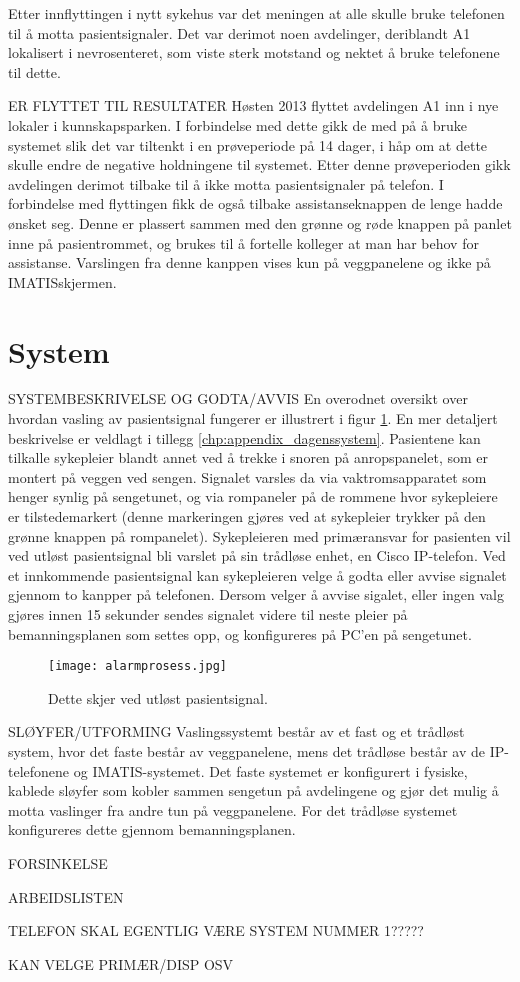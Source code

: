 \noindent
Etter innflyttingen i nytt sykehus var det meningen at alle skulle bruke telefonen til å motta pasientsignaler. Det var derimot noen avdelinger, deriblandt A1 lokalisert i nevrosenteret, som viste sterk motstand og nektet å bruke telefonene til dette.

\noindent
ER FLYTTET TIL RESULTATER
Høsten 2013 flyttet avdelingen A1 inn i nye lokaler i kunnskapsparken. I forbindelse med dette gikk de med på å bruke systemet slik det var tiltenkt i en prøveperiode på 14 dager, i håp om at dette skulle endre de negative holdningene til systemet. Etter denne prøveperioden gikk avdelingen derimot tilbake til å ikke motta pasientsignaler på telefon. 
I forbindelse med flyttingen fikk de også tilbake assistanseknappen de lenge hadde ønsket seg. Denne er plassert sammen med den grønne og røde knappen på panlet inne på pasientrommet, og brukes til å fortelle kolleger at man har behov for assistanse. Varslingen fra denne kanppen vises kun på veggpanelene og ikke på IMATISskjermen.

\section{System}
SYSTEMBESKRIVELSE OG GODTA/AVVIS
En overodnet oversikt over hvordan vasling av pasientsignal fungerer er illustrert i figur \ref{fig:detteskjer}. En mer detaljert beskrivelse er veldlagt i tillegg \ref{chp:appendix_dagenssystem}.
Pasientene kan tilkalle sykepleier blandt annet ved å trekke i snoren på anropspanelet, som er montert på veggen ved sengen. Signalet varsles da via vaktromsapparatet som henger synlig på sengetunet, og via rompaneler på de rommene hvor sykepleiere er tilstedemarkert (denne markeringen gjøres ved at sykepleier trykker på den grønne knappen på rompanelet). 
Sykepleieren med primæransvar for pasienten vil ved utløst pasientsignal bli varslet på sin trådløse enhet, en Cisco IP-telefon. 
Ved et innkommende pasientsignal kan sykepleieren velge å godta eller avvise signalet gjennom to kanpper på telefonen. Dersom velger å avvise sigalet, eller ingen valg gjøres innen 15 sekunder sendes signalet videre til neste pleier på bemanningsplanen som settes opp, og konfigureres på PC'en på sengetunet.

\begin{figure}[H]
\centering
\texttt{[image: alarmprosess.jpg]}
\caption{Dette skjer ved utløst pasientsignal.}
\label{fig:detteskjer}
\end{figure}

\noindent
SLØYFER/UTFORMING
Vaslingssystemt består av et fast og et trådløst system, hvor det faste består av veggpanelene, mens det trådløse består av de IP-telefonene og IMATIS-systemet. Det faste systemet er konfigurert i fysiske, kablede sløyfer som kobler sammen sengetun på avdelingene og gjør det mulig å motta vaslinger fra andre tun på veggpanelene. For det trådløse systemet konfigureres dette gjennom bemanningsplanen. 


\noindent
FORSINKELSE

ARBEIDSLISTEN

TELEFON SKAL EGENTLIG VÆRE SYSTEM NUMMER 1?????

KAN VELGE PRIMÆR/DISP OSV


